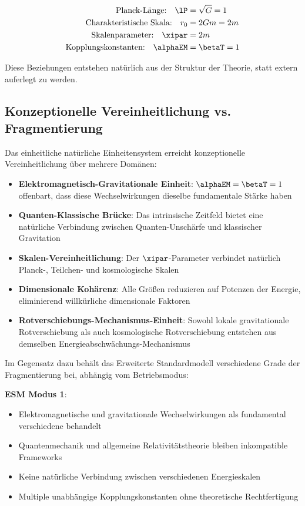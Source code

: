 	\begin{align}
		\text{Planck-Länge:} \quad \lP &= \sqrt{G} = 1 \nonumber\\
		\text{Charakteristische Skala:} \quad r_0 &= 2Gm = 2m \nonumber\\
		\text{Skalenparameter:} \quad \xipar &= 2m \nonumber\\
		\text{Kopplungskonstanten:} \quad \alphaEM &= \betaT = 1 \nonumber
	\end{align}
	
	Diese Beziehungen entstehen natürlich aus der Struktur der Theorie, statt extern auferlegt zu werden.
	
	\subsection{Konzeptionelle Vereinheitlichung vs. Fragmentierung}
	\label{subsec:unification_fragmentation}
	
	Das einheitliche natürliche Einheitensystem erreicht konzeptionelle Vereinheitlichung über mehrere Domänen:
	
	\begin{itemize}
		\item \textbf{Elektromagnetisch-Gravitationale Einheit}: $\alphaEM = \betaT = 1$ offenbart, dass diese Wechselwirkungen dieselbe fundamentale Stärke haben
		\item \textbf{Quanten-Klassische Brücke}: Das intrinsische Zeitfeld bietet eine natürliche Verbindung zwischen Quanten-Unschärfe und klassischer Gravitation
		\item \textbf{Skalen-Vereinheitlichung}: Der $\xipar$-Parameter verbindet natürlich Planck-, Teilchen- und kosmologische Skalen
		\item \textbf{Dimensionale Kohärenz}: Alle Größen reduzieren auf Potenzen der Energie, eliminierend willkürliche dimensionale Faktoren
		\item \textbf{Rotverschiebungs-Mechanismus-Einheit}: Sowohl lokale gravitationale Rotverschiebung als auch kosmologische Rotverschiebung entstehen aus demselben Energieabschwächungs-Mechanismus
	\end{itemize}
	
	Im Gegensatz dazu behält das Erweiterte Standardmodell verschiedene Grade der Fragmentierung bei, abhängig vom Betriebsmodus:
	
	\textbf{ESM Modus 1}:
	\begin{itemize}
		\item Elektromagnetische und gravitationale Wechselwirkungen als fundamental verschiedene behandelt
		\item Quantenmechanik und allgemeine Relativitätstheorie bleiben inkompatible Frameworks
		\item Keine natürliche Verbindung zwischen verschiedenen Energieskalen
		\item Multiple unabhängige Kopplungskonstanten ohne theoretische Rechtfertigung
	\end{itemize}
	
